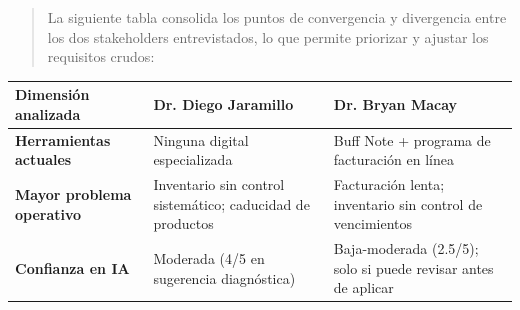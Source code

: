 \documentclass[
]{article}
\newcounter{none} %
\begin{document}
\begin{quote}
La siguiente tabla consolida los puntos de convergencia y divergencia
entre los dos stakeholders entrevistados, lo que permite priorizar y
ajustar los requisitos crudos:
\end{quote}

{\def\LTcaptype{none} %
\begin{longtable}[]{@{}
  >{\raggedright\arraybackslash}p{}
  >{\raggedright\arraybackslash}p{}
  >{\raggedright\arraybackslash}p{}@{}}
\toprule\noalign{}
\begin{minipage}[b]{\linewidth}\raggedright
\textbf{Dimensión analizada}
\end{minipage} & \begin{minipage}[b]{\linewidth}\raggedright
\textbf{Dr. Diego Jaramillo}
\end{minipage} & \begin{minipage}[b]{\linewidth}\raggedright
\textbf{Dr. Bryan Macay}
\end{minipage} \\
\midrule\noalign{}
\endhead
\bottomrule\noalign{}
\endlastfoot
\textbf{Herramientas actuales} &
\begin{minipage}[t]{\linewidth}\raggedright
Ninguna digital especializada
\end{minipage} & \begin{minipage}[t]{\linewidth}\raggedright
Buff Note + programa de facturación en línea
\end{minipage} \\
\textbf{Mayor problema operativo} &
\begin{minipage}[t]{\linewidth}\raggedright
Inventario sin control sistemático; caducidad de productos
\end{minipage} & \begin{minipage}[t]{\linewidth}\raggedright
Facturación lenta; inventario sin control de vencimientos
\end{minipage} \\
\textbf{Confianza en IA} & \begin{minipage}[t]{\linewidth}\raggedright
Moderada (4/5 en sugerencia diagnóstica)
\end{minipage} & \begin{minipage}[t]{\linewidth}\raggedright
Baja-moderada (2.5/5); solo si puede revisar antes de aplicar
\end{minipage} \\
\end{longtable}
}
\end{document}
